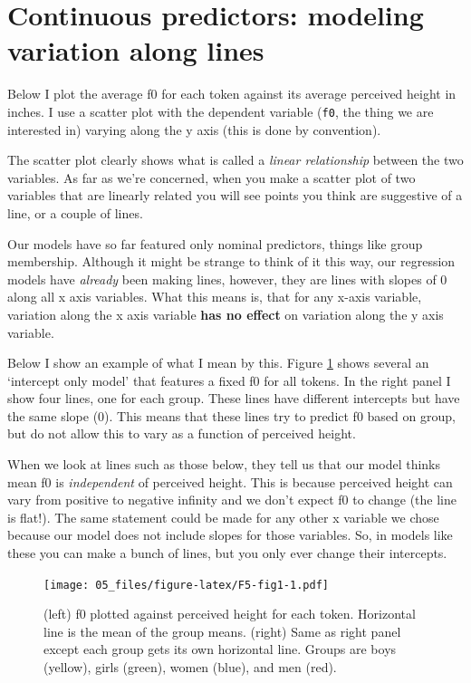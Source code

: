 \documentclass[
]{book}
\begin{document}
\hypertarget{continuous-predictors-modeling-variation-along-lines}{%
\section{Continuous predictors: modeling variation along lines}\label{continuous-predictors-modeling-variation-along-lines}}

Below I plot the average f0 for each token against its average perceived height in inches. I use a scatter plot with the dependent variable (\texttt{f0}, the thing we are interested in) varying along the y axis (this is done by convention).

The scatter plot clearly shows what is called a \emph{linear relationship} between the two variables. As far as we're concerned, when you make a scatter plot of two variables that are linearly related you will see points you think are suggestive of a line, or a couple of lines.

Our models have so far featured only nominal predictors, things like group membership. Although it might be strange to think of it this way, our regression models have \emph{already} been making lines, however, they are lines with slopes of 0 along all x axis variables. What this means is, that for any x-axis variable, variation along the x axis variable \textbf{has no effect} on variation along the y axis variable.

Below I show an example of what I mean by this. Figure \ref{fig:F5-fig1} shows several an `intercept only model' that features a fixed f0 for all tokens. In the right panel I show four lines, one for each group. These lines have different intercepts but have the same slope (0). This means that these lines try to predict f0 based on group, but do not allow this to vary as a function of perceived height.

When we look at lines such as those below, they tell us that our model thinks mean f0 is \emph{independent} of perceived height. This is because perceived height can vary from positive to negative infinity and we don't expect f0 to change (the line is flat!). The same statement could be made for any other x variable we chose because our model does not include slopes for those variables. So, in models like these you can make a bunch of lines, but you only ever change their intercepts.

\begin{figure}
\centering
\texttt{[image: 05\_files/figure-latex/F5-fig1-1.pdf]}
\caption{\label{fig:F5-fig1}(left) f0 plotted against perceived height for each token. Horizontal line is the mean of the group means. (right) Same as right panel except each group gets its own horizontal line. Groups are boys (yellow), girls (green), women (blue), and men (red).}
\end{figure}
\end{document}
